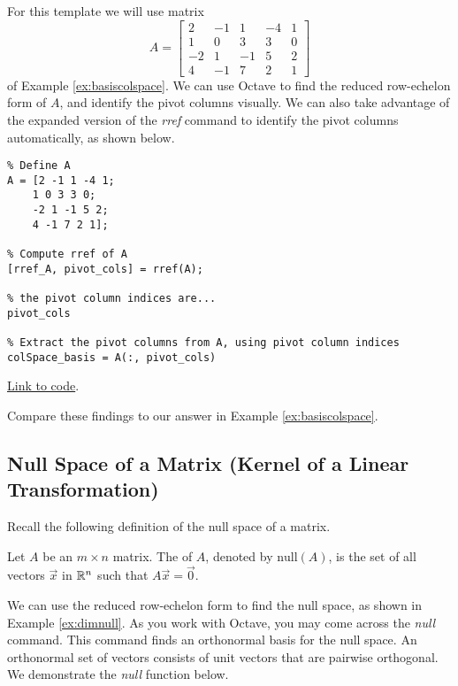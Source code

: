 \documentclass{ximera}
\begin{document}
\begin{template}\label{temp:colSpace}
For this template we will use matrix $$A=\begin{bmatrix}2&-1&1&-4&1\\1&0&3&3&0\\-2&1&-1&5&2\\4&-1&7&2&1\end{bmatrix}$$
of Example \ref{ex:basiscolspace}.  We can use Octave to find the reduced row-echelon form of $A$, and identify the pivot columns visually.  We can also take advantage of the expanded version of the \emph{rref} command to identify the pivot columns automatically, as shown below.

\begin{verbatim}
% Define A
A = [2 -1 1 -4 1;
    1 0 3 3 0;
    -2 1 -1 5 2;
    4 -1 7 2 1];

% Compute rref of A
[rref_A, pivot_cols] = rref(A);

% the pivot column indices are...
pivot_cols

% Extract the pivot columns from A, using pivot column indices
colSpace_basis = A(:, pivot_cols)
\end{verbatim}

\href{https://sagecell.sagemath.org/?z=eJxtTkEKwjAQvAfyh7kULNhiqiIoHoL6Ao9SSq2JBmxTklR8vhssKOjuZWeGmdkEe6VNpyA5k9jiVCATEMgWEBvOQCMww5x2NuKsiLrAEsXILCJcgfiSGM4S7GzbD0HBOaVhdUw_xbuSU_TmYUPV2LsvqTCyE5mOvnBTbx2kD20H011Mozxqp_I85-xjfhsOz-DqJvwYPbSzLahu8Ka7_g3ljPCxrxtVnWtvPH0jJ-vvB9MX3FlRVA==&lang=octave&interacts=eJyLjgUAARUAuQ==}{Link to code}.

Compare these findings to our answer in Example \ref{ex:basiscolspace}.
\end{template}  

\subsection*{Null Space of a Matrix (Kernel of a Linear Transformation)}

Recall the following definition of the null space of a matrix.
\begin{definition}[\ref{def:nullspace}] Let $A$ be an $m\times n$ matrix.  The  of $A$, denoted by $\mbox{null}(A)$, is the set of all vectors $\vec{x}$ in $\mathbb{R}^n$ such that $A\vec{x}=\vec{0}$.
\end{definition}

We can use the reduced row-echelon form to find the null space, as shown in Example \ref{ex:dimnull}.  As you work with Octave, you may come across the \emph{null} command.  This command finds an orthonormal basis for the null space.  An orthonormal set of vectors consists of unit vectors that are pairwise orthogonal.  We demonstrate the \emph{null} function below.
\end{document}

